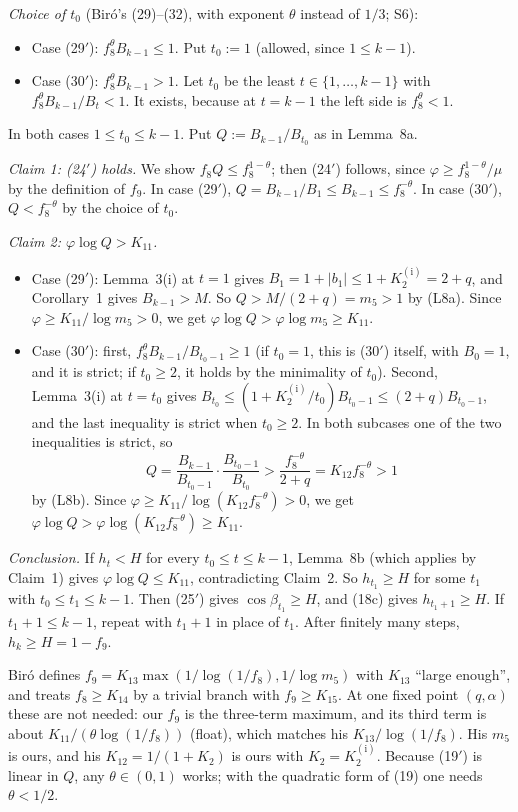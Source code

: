 \documentclass[11pt]{amsart}
\theoremstyle{remark}
\theoremstyle{plain}
\newcommand{\abs}[1]{\lvert #1\rvert}
\newcommand{\Kb}{K_2^{(\mathrm{i})}}
\begin{document}
\emph{Choice of $t_0$} (Bir\'o's (29)--(32), with exponent $\theta$ instead of $1/3$; S6):
\begin{itemize}[leftmargin=*]
\item Case (29$'$): $f_8^\theta B_{k-1}\le1$. Put $t_0:=1$ (allowed, since $1\le k-1$).
\item Case (30$'$): $f_8^\theta B_{k-1}>1$. Let $t_0$ be the least $t\in\{1,\dots,k-1\}$ with $f_8^\theta B_{k-1}/B_t<1$. It exists, because at $t=k-1$ the left side is $f_8^\theta<1$.
\end{itemize}
In both cases $1\le t_0\le k-1$. Put $Q:=B_{k-1}/B_{t_0}$ as in Lemma~8a.

\emph{Claim 1: (24$'$) holds.} We show $f_8Q\le f_8^{1-\theta}$; then (24$'$) follows, since $\varphi\ge f_8^{1-\theta}/\mu$ by the definition of $f_9$. In case (29$'$), $Q=B_{k-1}/B_1\le B_{k-1}\le f_8^{-\theta}$. In case (30$'$), $Q<f_8^{-\theta}$ by the choice of $t_0$.

\emph{Claim 2: $\varphi\log Q>K_{11}$.}
\begin{itemize}[leftmargin=*]
\item Case (29$'$): Lemma~3(i) at $t=1$ gives $B_1=1+\abs{b_1}\le1+\Kb=2+q$, and Corollary~1 gives $B_{k-1}>M$. So $Q>M/(2+q)=m_5>1$ by (L8a). Since $\varphi\ge K_{11}/\log m_5>0$, we get $\varphi\log Q>\varphi\log m_5\ge K_{11}$.
\item Case (30$'$): first, $f_8^\theta B_{k-1}/B_{t_0-1}\ge1$ (if $t_0=1$, this is (30$'$) itself, with $B_0=1$, and it is strict; if $t_0\ge2$, it holds by the minimality of $t_0$). Second, Lemma~3(i) at $t=t_0$ gives $B_{t_0}\le(1+\Kb/t_0)B_{t_0-1}\le(2+q)B_{t_0-1}$, and the last inequality is strict when $t_0\ge2$. In both subcases one of the two inequalities is strict, so
\[
Q=\frac{B_{k-1}}{B_{t_0-1}}\cdot\frac{B_{t_0-1}}{B_{t_0}}>\frac{f_8^{-\theta}}{2+q}=K_{12}f_8^{-\theta}>1
\]
by (L8b). Since $\varphi\ge K_{11}/\log(K_{12}f_8^{-\theta})>0$, we get $\varphi\log Q>\varphi\log(K_{12}f_8^{-\theta})\ge K_{11}$.
\end{itemize}

\emph{Conclusion.} If $h_t<H$ for every $t_0\le t\le k-1$, Lemma~8b (which applies by Claim~1) gives $\varphi\log Q\le K_{11}$, contradicting Claim~2. So $h_{t_1}\ge H$ for some $t_1$ with $t_0\le t_1\le k-1$. Then (25$'$) gives $\cos\beta_{t_1}\ge H$, and (18c) gives $h_{t_1+1}\ge H$. If $t_1+1\le k-1$, repeat with $t_1+1$ in place of $t_1$. After finitely many steps, $h_k\ge H=1-f_9$.

Bir\'o defines $f_9=K_{13}\max(1/\log(1/f_8),1/\log m_5)$ with $K_{13}$ ``large enough'', and treats $f_8\ge K_{14}$ by a trivial branch with $f_9\ge K_{15}$. At one fixed point $(q,\alpha)$ these are not needed: our $f_9$ is the three-term maximum, and its third term is about $K_{11}/(\theta\log(1/f_8))$ (float), which matches his $K_{13}/\log(1/f_8)$. His $m_5$ is ours, and his $K_{12}=1/(1+K_2)$ is ours with $K_2=\Kb$. Because (19$'$) is linear in $Q$, any $\theta\in(0,1)$ works; with the quadratic form of (19) one needs $\theta<1/2$.
\end{document}
